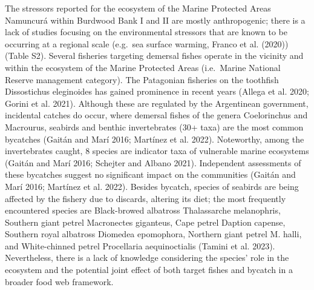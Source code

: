 \documentclass[
]{article}
\begin{document}
The stressors reported for the ecosystem of the Marine Protected Areas
Namuncurá within Burdwood Bank I and II are mostly anthropogenic; there
is a lack of studies focusing on the environmental stressors that are
known to be occurring at a regional scale (e.g.~sea surface warming,
Franco et al. (2020)) (Table S2). Several fisheries targeting demersal
fishes operate in the vicinity and within the ecosystem of the Marine
Protected Areas (i.e.~Marine National Reserve management category). The
Patagonian fisheries on the toothfish Dissostichus eleginoides has
gained prominence in recent years (Allega et al. 2020; Gorini et al.
2021). Although these are regulated by the Argentinean government,
incidental catches do occur, where demersal fishes of the genera
Coelorinchus and Macrourus, seabirds and benthic invertebrates (30+
taxa) are the most common bycatches (Gaitán and Marí 2016; Martínez et
al. 2022). Noteworthy, among the invertebrates caught, 8 species are
indicator taxa of vulnerable marine ecosystems (Gaitán and Marí 2016;
Schejter and Albano 2021). Independent assessments of these bycatches
suggest no significant impact on the communities (Gaitán and Marí 2016;
Martínez et al. 2022). Besides bycatch, species of seabirds are being
affected by the fishery due to discards, altering its diet; the most
frequently encountered species are Black-browed albatross Thalassarche
melanophris, Southern giant petrel Macronectes giganteus, Cape petrel
Daption capense, Southern royal albatross Diomedea epomophora, Northern
giant petrel M. halli, and White-chinned petrel Procellaria
aequinoctialis (Tamini et al. 2023). Nevertheless, there is a lack of
knowledge considering the species' role in the ecosystem and the
potential joint effect of both target fishes and bycatch in a broader
food web framework.
\end{document}
